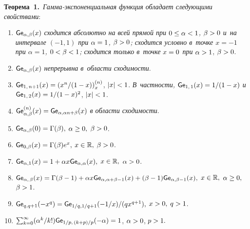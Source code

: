 \begin{multicols}{2}
\noindent
\textbf{Теорема~1.}\
\textit{Гамма-экспо\-нен\-ци\-аль\-ная функция обладает следующими свойствами}:
\begin{enumerate}
\item ${\sf Ge}_{\alpha, \beta} (x)$ 
\textit{сходится абсолютно на всей прямой при $0\hm\le\alpha\hm<1$, $\beta\hm>0$ и~на интервале $(-1,1)$ при $\alpha\hm=1$, $\beta\hm>0$; 
сходится условно в~точке $x = -1$ при 
$\alpha=1$, $0\hm<\beta\hm<1$; сходится только 
в~точке  $x\hm = 0$ при} $\alpha\hm>1$, $\beta\hm>0$.
\item ${\sf Ge}_{\alpha, \beta}(x)$ \textit{непрерывна в~области сходимости}.
\item $\G_{1,\, n+1} (x) \hm= \left({x^n}/{(1-x)}\right)^{(n)}_x$, $|x|\hm<1$. 
\textit{В~частности, $\G_{1,\, 1} (x)\hm= {1/{(1\hm-x)}}$ и}
$\G_{1,\, 2} (x)\hm= {1/{(1\hm-x)^2}}$,  $|x|\hm<1$.
\item ${\sf Ge}^{(n)}_{\alpha, \beta} (x) = {\sf Ge}_{\alpha, \alpha n + \beta}(x)$ 
\textit{в области сходимости}.
\item $\G_{\alpha, \beta} (0)\hm=\Gamma(\beta),$ $\alpha\hm\ge0,$ $\beta\hm> 0$.
\item ${\sf Ge}_{0, \beta} (x)= \Gamma(\beta)e^{x},$ $x\hm\in\mathbb{R},$ $\beta\hm> 0$.
\item $\G_{\alpha, 1}(x)=1\hm+\alpha x\G_{\alpha, \alpha}(x),$ $x\hm\in
\mathbb{R},$ $\alpha\hm>0$.
\item $\G_{\alpha,\, \beta}(x)=\Gamma(\beta-1)+\alpha x \G_{\alpha,\alpha+\beta-1}(x)
+(\beta\hm-1)\G_{\alpha, \beta-1}(x),$ $x\hm\in\mathbb{R},$ $\alpha\hm\ge0,$ $\beta\hm>1$.
\item ${\sf Ge}_{q, q+1}(-x^q)={\sf Ge}_{1/q, 1/q+1 }(-{1/x})/{({qx^{q+1}})},$ $x\hm>0,$ $q\hm>1$.
\item $\sum\nolimits_{k=0}^\infty ({\alpha^k}/{k!}) \G_{1/p,\, (k+p)/p}(- \alpha)\hm= 1$, 
$\alpha\hm>0$, $p\hm>1.$
\end{enumerate}



\end{multicols}
